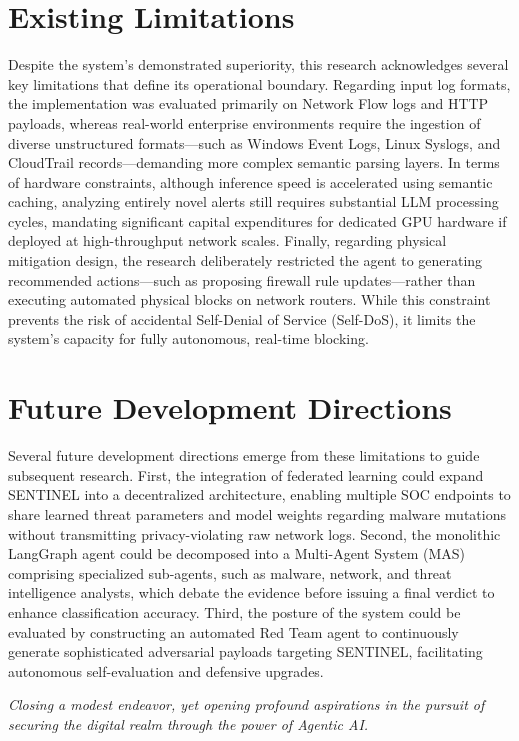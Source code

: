 \section{Existing Limitations}
Despite the system's demonstrated superiority, this research acknowledges several key limitations that define its operational boundary. Regarding input log formats, the implementation was evaluated primarily on Network Flow logs and HTTP payloads, whereas real-world enterprise environments require the ingestion of diverse unstructured formats—such as Windows Event Logs, Linux Syslogs, and CloudTrail records—demanding more complex semantic parsing layers. In terms of hardware constraints, although inference speed is accelerated using semantic caching, analyzing entirely novel alerts still requires substantial LLM processing cycles, mandating significant capital expenditures for dedicated GPU hardware if deployed at high-throughput network scales. Finally, regarding physical mitigation design, the research deliberately restricted the agent to generating recommended actions—such as proposing firewall rule updates—rather than executing automated physical blocks on network routers. While this constraint prevents the risk of accidental Self-Denial of Service (Self-DoS), it limits the system's capacity for fully autonomous, real-time blocking.

\section{Future Development Directions}
Several future development directions emerge from these limitations to guide subsequent research. First, the integration of federated learning could expand SENTINEL into a decentralized architecture, enabling multiple SOC endpoints to share learned threat parameters and model weights regarding malware mutations without transmitting privacy-violating raw network logs. Second, the monolithic LangGraph agent could be decomposed into a Multi-Agent System (MAS) comprising specialized sub-agents, such as malware, network, and threat intelligence analysts, which debate the evidence before issuing a final verdict to enhance classification accuracy. Third, the posture of the system could be evaluated by constructing an automated Red Team agent to continuously generate sophisticated adversarial payloads targeting SENTINEL, facilitating autonomous self-evaluation and defensive upgrades.

\vspace{1cm}
\begin{flushright}
    \textit{Closing a modest endeavor, yet opening profound aspirations in the pursuit of securing the digital realm through the power of Agentic AI.}
\end{flushright}
